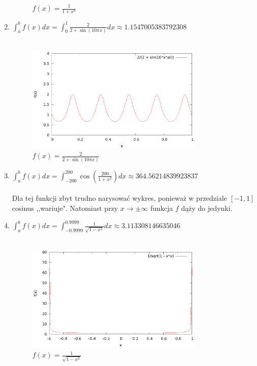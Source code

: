 \documentclass{article}
\begin{document}
\begin{enumerate}
\begin{figure}[H]
		\caption{$f(x) = \frac{1}{1 + x^4}$}
	\end{figure}
	\item $\int_a^b f(x) dx = \int_0^1 \frac{2}{2 + \sin(10 \pi x)} dx \approx 1.1547005383792308$ \\ \\
	\begin{figure}[H]
		\centering
		\includegraphics[width=0.8\textwidth]{wykresy/3.eps}
		\caption{$f(x) = \frac{2}{2 + \sin(10 \pi x)}$}
	\end{figure}
	\item $\int_a^b f(x) dx = \int_{-200}^{200} \cos(\frac{200}{1 + x^2}) dx  \approx 364.56214839923837$ \\ \\
		Dla tej funkcji zbyt trudno narysować wykres, ponieważ w przedziale $[-1, 1]$ cosinus ,,wariuje".
		Natomiast przy $x \to \pm \infty$ funkcja $f$ dąży do jedynki.
	\item $\int_a^b f(x) dx = \int_{-0.9999}^{0.9999} \frac{1}{\sqrt{1 - x^2}} dx \approx 3.113308146635046$ \\ \\
	\begin{figure}[H]
		\centering
		\includegraphics[width=0.8\textwidth]{wykresy/5.eps}
		\caption{$f(x) = \frac{1}{\sqrt{1 - x^2}}$}
	\end{figure}
\end{enumerate}
\end{document}
